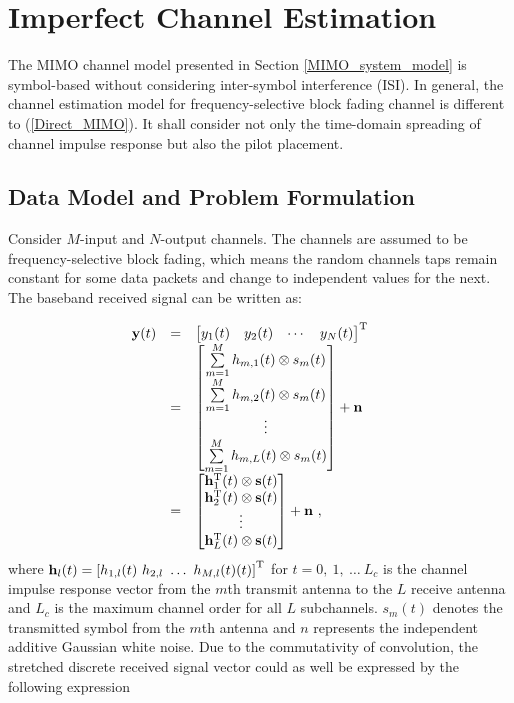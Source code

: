 \documentclass[10pt,fleqn, twocolumn]{IEEEtran}
\newcommand{\bh}{{\bf h}}
\newcommand{\bH}{{\bf H}}
\newcommand{\bs}{{\bf s}}
\newcommand{\bn}{{\bf n}}
\newcommand{\by}{{\bf y}}
\begin{document}
\section{Imperfect Channel Estimation}
The MIMO channel model presented in Section
\ref{MIMO_system_model} is symbol-based without considering
inter-symbol interference (ISI). In general, the channel
estimation model for frequency-selective block fading channel is
different to (\ref{Direct_MIMO}). It shall consider not only the
time-domain spreading of channel impulse response but also the
pilot placement.

\subsection{Data Model and Problem Formulation}
Consider $M$-input and $N$-output channels. The channels are
assumed to be frequency-selective block fading, which means the
random channels taps remain constant for some data packets and
change to independent values for the next. The baseband received
signal can be written as:

\begin{equation}\hspace{-0.20in}
\begin{array}{rcl}
\by(t)&=&\left[\begin{matrix}y_{1}(t)&y_{2}(t)&\cdots&y_{N}(t)\end{matrix}\right]^{\rm T}\\
&=&\left[\begin{matrix}\sum\limits_{m=1}^{M}h_{m,1}(t)\otimes s_m(t)\\ \sum\limits_{m=1}^{M}h_{m,2}(t)\otimes s_m(t)\\ \vdots \\
\sum\limits_{m=1}^{M}h_{m,L}(t)\otimes
s_m(t)\end{matrix}\right]+\bn\\
&=&\left[\begin{matrix}\bh_{1}^{\rm T}(t)\otimes \bs(t)\\ \bh_{2}^{\rm T}(t)\otimes \bs(t)\\ \vdots \\
\bh_{L}^{\rm T}(t)\otimes \bs(t)\end{matrix}\right]+\bn\ ,
\end{array}
\end{equation}
\noindent where $\bh_{l}(t)=\left[h_{1,l}(t)\ h_{2,l}\ \ldots\
h_{M,l}(t)(t)\right]^{\rm T}$ for $t=0,\ 1,\ \ldots\ L_{c}$ is the
channel impulse response vector from the $m$th transmit antenna to
the $L$ receive antenna and $L_{c}$ is the maximum channel order
for all $L$ subchannels. $s_m(t)$ denotes the transmitted symbol
from the $m$th antenna and $n$ represents the independent additive
Gaussian white noise. Due to the commutativity of convolution, the
stretched discrete received signal vector could as well be
expressed by the following expression
\end{document}
